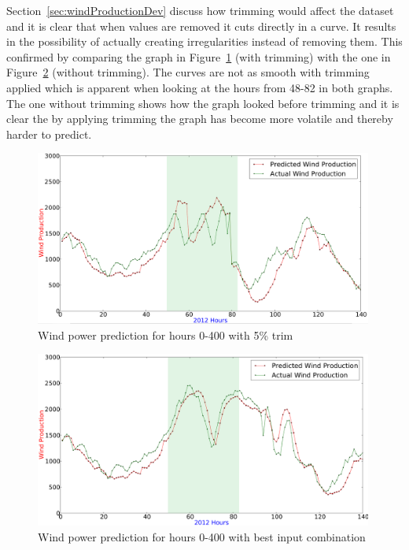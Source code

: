 Section~\ref{sec:windProductionDev} discuss how trimming would affect the dataset and it is clear that when values are removed it cuts directly in a curve. It results in the possibility of actually creating irregularities instead of removing them. This confirmed by comparing the graph in Figure~\ref{fig:fivePercentTrimPrediction} (with trimming) with the one in Figure~\ref{fig:bestInputPredictFrom0-400} (without trimming). The curves are not as smooth with trimming applied which is apparent when looking at the hours from 48-82 in both graphs. The one without trimming shows how the graph looked before trimming and it is clear the by applying trimming the graph has become more volatile and thereby harder to predict.

\begin{figure}[H]
\centering
\includegraphics[width=0.99\textwidth]{billeder/fivePercentTrimPrediction.png}
\caption{Wind power prediction for hours 0-400 with 5\% trim}
\label{fig:fivePercentTrimPrediction}
\end{figure} 

\begin{figure}[H]
\centering
\includegraphics[width=0.99\textwidth]{billeder/bestInputPredictFrom0-400.png}
\caption{Wind power prediction for hours 0-400 with best input combination}
\label{fig:bestInputPredictFrom0-400}
\end{figure} 

